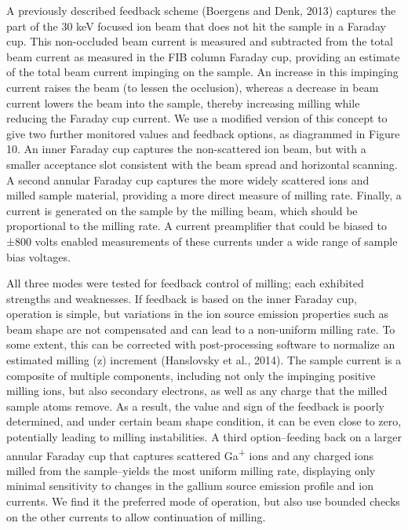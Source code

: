 \documentclass{article}
\begin{document}
A previously described feedback scheme (Boergens and Denk, 2013) captures the part of the 30 keV focused ion beam that does not hit the sample in a Faraday cup. This non-occluded beam current is measured and subtracted from the total beam current as measured in the FIB column Faraday cup, providing an estimate of the total beam current impinging on the sample. An increase in this impinging current raises the beam (to lessen the occlusion), whereas a decrease in beam current lowers the beam into the sample, thereby increasing milling while reducing the Faraday cup current. We use a modified version of this concept to give two further monitored values and feedback options, as diagrammed in Figure 10. An inner Faraday cup captures the non-scattered ion beam, but with a smaller acceptance slot consistent with the beam spread and horizontal scanning. A second annular Faraday cup captures the more widely scattered ions and milled sample material, providing a more direct measure of milling rate. Finally, a current is generated on the sample by the milling beam, which should be proportional to the milling rate. A current preamplifier that could be biased to ±800 volts enabled measurements of these currents under a wide range of sample bias voltages.

All three modes were tested for feedback control of milling; each exhibited strengths and weaknesses. If feedback is based on the inner Faraday cup, operation is simple, but variations in the ion source emission properties such as beam shape are not compensated and can lead to a non-uniform milling rate. To some extent, this can be corrected with post-processing software to normalize an estimated milling (z) increment (Hanslovsky et al., 2014). The sample current is a composite of multiple components, including not only the impinging positive milling ions, but also secondary electrons, as well as any charge that the milled sample atoms remove. As a result, the value and sign of the feedback is poorly determined, and under certain beam shape condition, it can be even close to zero, potentially leading to milling instabilities. A third option–feeding back on a larger annular Faraday cup that captures scattered Ga\textsuperscript{+} ions and any charged ions milled from the sample–yields the most uniform milling rate, displaying only minimal sensitivity to changes in the gallium source emission profile and ion currents. We find it the preferred mode of operation, but also use bounded checks on the other currents to allow continuation of milling.
\end{document}
